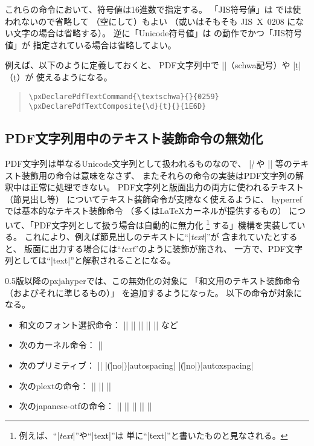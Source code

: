 \documentclass[uplatex,dvipdfmx,a4paper]{jsarticle}
\newcommand{\Pkg}[1]{\textsf{#1}}
\newcommand{\Means}{：\quad}
\begin{document}
これらの命令において、符号値は16進数で指定する。
「JIS符号値」は {\upLaTeX} では使われないので省略して
（空にして）もよい
（或いはそもそも JIS~X~0208 にない文字の場合は省略する）。
逆に「Unicode符号値」は {\pLaTeX} の動作でかつ「JIS符号値」が
指定されている場合は省略してよい。

例えば、以下のように定義しておくと、
PDF文字列中で |\textschwa|（schwa記号）や |\d{t}|（\d{t}）が
使えるようになる。
\begin{quote}\small\begin{verbatim}
\pxDeclarePdfTextCommand{\textschwa}{}{0259}
\pxDeclarePdfTextComposite{\d}{t}{}{1E6D}
\end{verbatim}\end{quote}

\subsection{PDF文字列用中のテキスト装飾命令の無効化}
\label{ssec:disablecmds}

PDF文字列は単なるUnicode文字列として扱われるものなので、
|\textit| や |\large| 等のテキスト装飾用の命令は意味をなさず、
またそれらの命令の実装はPDF文字列の解釈中は正常に処理できない。
PDF文字列と版面出力の両方に使われるテキスト（節見出し等）
についてテキスト装飾命令が支障なく使えるように、
\Pkg{hyperref}では基本的なテキスト装飾命令
（多くは{\LaTeX}カーネルが提供するもの）
について、「PDF文字列として扱う場合は自動的に無力化
\footnote{例えば、“|\textit{text}|”や“|{\large text}|”は
  単に“|text|”と書いたものと見なされる。}
する」機構を実装している。
これにより、例えば節見出しのテキストに“|\textit{text}|”が
含まれていたとすると、
版面に出力する場合には“\textit{text}”のように装飾が施され、
一方で、PDF文字列としては“|text|”と解釈されることになる。

0.5版以降の\Pkg{pxjahyper}では、この無効化の対象に
「和文用のテキスト装飾命令（およびそれに準じるもの）」
を追加するようになった。
以下の命令が対象になる。

\begin{itemize}
\item 和文のフォント選択命令\Means
  |\textmc| |\gtfamily| |\kanjifamily| |\useroman| |\userelfont|
  など
\item 次の{\pLaTeX}カーネル命令\Means
  |\<|
\item 次の{\pTeX}プリミティブ\Means
  |\inhibitglue| |\|(|no|)|autospacing| |\|(|no|)|autoxspacing|
\item 次の\Pkg{plext}の命令\Means
  |\bou| |\kasen| |\rensuji|
\item 次の\Pkg{japanese-otf}の命令\Means
  |\textmg| |\mgfamily| |\ltseries| |\ebseries| |\propshape|
\end{itemize}
\end{document}

